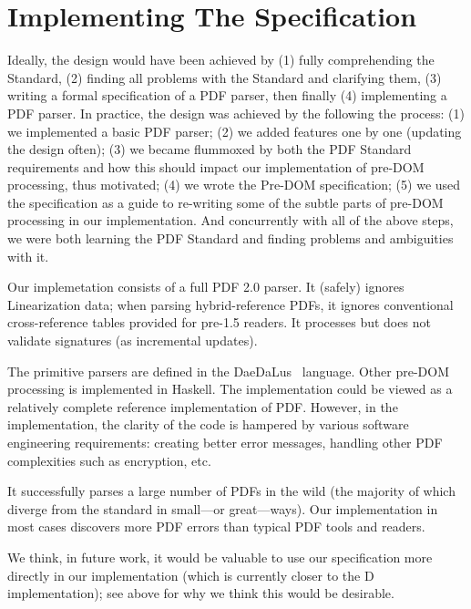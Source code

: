 \section{Implementing The Specification}
\label{sec:implementation}

Ideally, the design would have been achieved by
%
(1) fully comprehending the Standard,
(2) finding all problems with the Standard and clarifying them,
(3) writing a formal specification of a PDF parser,
then finally (4) implementing a PDF parser.
%
In practice, the design was achieved by the following the process:
%
(1) we implemented a basic PDF parser;
(2) we added features one by one (updating the design often);
(3) we became flummoxed by both the PDF Standard requirements and how this
should impact our implementation of pre-DOM processing, thus motivated;
(4) we wrote the Pre-DOM specification;
(5) we used the specification as a guide to re-writing some of
the subtle parts of pre-DOM processing in our implementation.
%
And concurrently with all of the above steps, we were both learning the PDF
Standard and finding problems and ambiguities with it.

Our implemetation consists of a full PDF 2.0 parser.  It (safely) ignores
Linearization data;
%
when parsing hybrid-reference PDFs, it ignores conventional
cross-reference tables provided for pre-1.5 readers.
%
It processes but does not validate signatures (as incremental
updates).

The primitive parsers are defined in the DaeDaLus~\cite{daedalusrepo}
language.
%
Other pre-DOM processing is implemented in Haskell.
%
The implementation could be viewed as a relatively complete reference 
implementation of PDF.
However, in the implementation, 
the clarity of the code is hampered by various software engineering
requirements:
creating better error messages,
handling other PDF complexities such as encryption,
etc.

It successfully parses a large number of PDFs in the wild
(the majority of which diverge from the standard in small---or great---ways).
Our implementation in most cases discovers more PDF errors than
typical PDF tools and readers.

We think, in future work, it would be valuable to use our specification more
directly in our implementation (which is currently closer to the D
implementation);
%
see  above for why we think this would be
desirable.

% 
 
